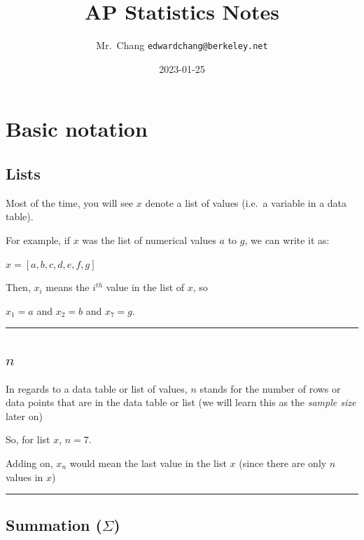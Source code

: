 \documentclass[
]{book}
\title{AP Statistics Notes}
\author{Mr.~Chang \texttt{edwardchang@berkeley.net}}
\date{2023-01-25}
\theoremstyle{definition}
\theoremstyle{definition}
\theoremstyle{definition}
\theoremstyle{definition}
\theoremstyle{remark}
\begin{document}
\maketitle

{
\setcounter{tocdepth}{1}
\tableofcontents
}
\hypertarget{basic-notation}{%
\chapter{Basic notation}\label{basic-notation}}

\hypertarget{lists}{%
\section{Lists}\label{lists}}

Most of the time, you will see \(x\) denote a list of values (i.e.~a
variable in a data table).

For example, if \(x\) was the list of numerical values \(a\) to \(g\), we can
write it as:

\(x = [a, b, c, d, e, f, g]\)

Then, \(x_i\) means the \(i^{th}\) value in the list of \(x\), so

\(x_1 = a\) and \(x_2 = b\) and \(x_7 = g\).

\begin{center}\rule{0.5\linewidth}{0.5pt}\end{center}

\hypertarget{n}{%
\section{\texorpdfstring{\(n\)}{n}}\label{n}}

In regards to a data table or list of values, \(n\) stands for the number
of rows or data points that are in the data table or list (we will learn
this as the \emph{sample size} later on)

So, for list \(x\), \(n = 7\).

Adding on, \(x_n\) would mean the last value in the list \(x\) (since there
are only \(n\) values in \(x\))

\begin{center}\rule{0.5\linewidth}{0.5pt}\end{center}

\hypertarget{summation-sigma}{%
\section{\texorpdfstring{Summation (\(\Sigma\))}{Summation (\textbackslash Sigma)}}\label{summation-sigma}}
\end{document}
